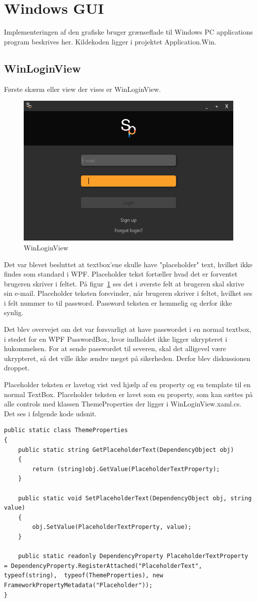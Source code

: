 \section{Windows GUI}
Implementeringen af den grafiske bruger grænseflade til Windows PC applications program beskrives her.
Kildekoden ligger i projektet Application.Win.
\subsection{WinLoginView}
Første skærm eller view der vises er WinLoginView.
\begin{figure}
	\centering
	\includegraphics[width=0.7\linewidth]{figs/implementering/winloginview}
	\caption{WinLoginView}
	\label{fig:winloginview}
\end{figure}
Det var blevet besluttet at textbox'ene skulle have "placeholder" text, hvilket ikke findes som standard i WPF. Placeholder tekst fortæller hvad det er forventet brugeren skriver i feltet. På figur~\ref{fig:winloginview} ses det i øverste felt at brugeren skal skrive sin e-mail. Placeholder teksten forsvinder, når brugeren skriver i feltet, hvilket ses i felt nummer to til password. Password teksten er hemmelig og derfor ikke synlig. 

Det blev overvejet om det var forsvarligt at have passwordet i en normal textbox, i stedet for en WPF PasswordBox, hvor indholdet ikke ligger ukrypteret i hukommelsen. 
For at sende passwordet til severen, skal det alligevel være ukrypteret, så det ville ikke ændre meget på sikerheden. Derfor blev diskussionen droppet.

Placeholder teksten er lavetog vist ved hjælp af en property og en template til en normal TextBox.
Placeholder teksten er lavet som en property, som kan sættes på alle controls med klassen ThemeProperties der ligger i WinLoginView.xaml.cs. Det ses i følgende kode udsnit.
\begin{lstlisting}[caption=ThemeProperties, label=code:ThemeProperties]
public static class ThemeProperties
{
	public static string GetPlaceholderText(DependencyObject obj)
	{
		return (string)obj.GetValue(PlaceholderTextProperty);
	}
	
	public static void SetPlaceholderText(DependencyObject obj, string value)
	{
		obj.SetValue(PlaceholderTextProperty, value);
	}
	
	public static readonly DependencyProperty PlaceholderTextProperty = DependencyProperty.RegisterAttached("PlaceholderText", typeof(string),	typeof(ThemeProperties), new FrameworkPropertyMetadata("Placeholder"));
}
\end{lstlisting} 

